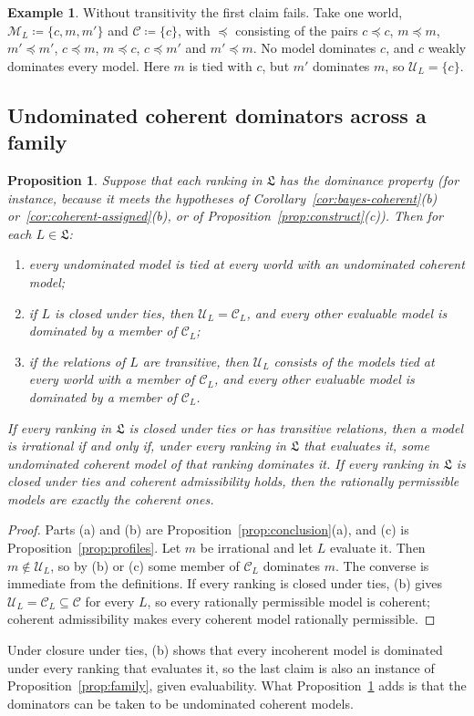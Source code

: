 \documentclass[11pt]{article}
\newtheorem{proposition}[theorem]{Proposition}
\theoremstyle{definition}
\newtheorem{example}[theorem]{Example}
\theoremstyle{remark}
\newcommand{\M}{\mathcal M}
\newcommand{\C}{\mathcal C}
\newcommand{\U}{\mathcal U}
\newcommand{\Lf}{\mathfrak L}
\begin{document}
\begin{example}\label{ex:intransitive}
Without transitivity the first claim fails. Take one world, $\M_L\coloneqq\{c,m,m'\}$ and $\C\coloneqq\{c\}$, with $\preceq$ consisting of the pairs $c\preceq c$, $m\preceq m$, $m'\preceq m'$, $c\preceq m$, $m\preceq c$, $c\preceq m'$ and $m'\preceq m$. No model dominates $c$, and $c$ weakly dominates every model. Here $m$ is tied with $c$, but $m'$ dominates $m$, so $\U_L=\{c\}$.
\end{example}

\subsection{Undominated coherent dominators across a family}
\begin{proposition}\label{prop:permissible}
Suppose that each ranking in $\Lf$ has the dominance property (for instance, because it meets the hypotheses of Corollary~\ref{cor:bayes-coherent}(b) or~\ref{cor:coherent-assigned}(b), or of Proposition~\ref{prop:construct}(c)). Then for each $L\in\Lf$:
\begin{enumerate}[label=(\alph*)]
\item every undominated model is tied at every world with an undominated coherent model;
\item if $L$ is closed under ties, then $\U_L=\C_L$, and every other evaluable model is dominated by a member of $\C_L$;
\item if the relations of $L$ are transitive, then $\U_L$ consists of the models tied at every world with a member of $\C_L$, and every other evaluable model is dominated by a member of $\C_L$.
\end{enumerate}
If every ranking in $\Lf$ is closed under ties or has transitive relations, then a model is irrational if and only if, under every ranking in $\Lf$ that evaluates it, some undominated coherent model of that ranking dominates it. If every ranking in $\Lf$ is closed under ties and coherent admissibility holds, then the rationally permissible models are exactly the coherent ones.
\end{proposition}
\begin{proof}
Parts (a) and (b) are Proposition~\ref{prop:conclusion}(a), and (c) is Proposition~\ref{prop:profiles}. Let $m$ be irrational and let $L$ evaluate it. Then $m\notin\U_L$, so by (b) or (c) some member of $\C_L$ dominates $m$. The converse is immediate from the definitions. If every ranking is closed under ties, (b) gives $\U_L=\C_L\subseteq\C$ for every $L$, so every rationally permissible model is coherent; coherent admissibility makes every coherent model rationally permissible.
\end{proof}
Under closure under ties, (b) shows that every incoherent model is dominated under every ranking that evaluates it, so the last claim is also an instance of Proposition~\ref{prop:family}, given evaluability. What Proposition~\ref{prop:permissible} adds is that the dominators can be taken to be undominated coherent models.
\end{document}
